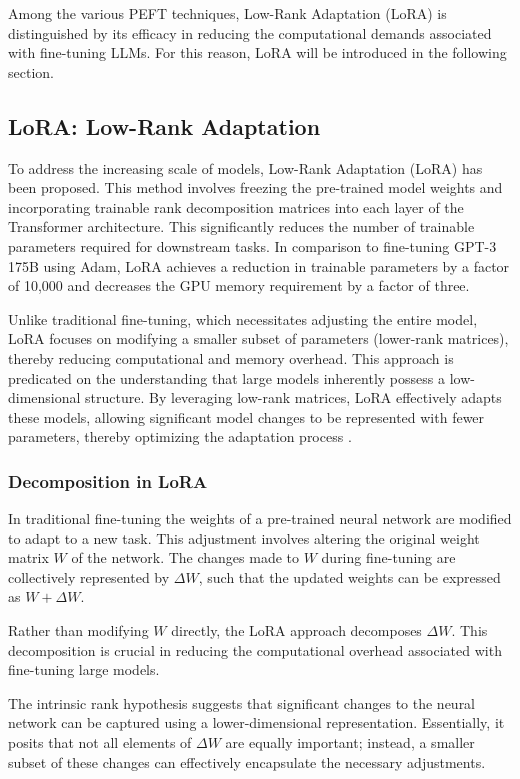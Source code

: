 Among the various PEFT techniques, Low-Rank Adaptation (LoRA) is distinguished by its efficacy in reducing the computational demands associated with fine-tuning LLMs. For this reason, LoRA will be introduced in the following section.

\subsection{LoRA: Low-Rank Adaptation}

To address the increasing scale of models, Low-Rank Adaptation (LoRA) has been proposed. This method involves freezing the pre-trained model weights and incorporating trainable rank decomposition matrices into each layer of the Transformer architecture. This significantly reduces the number of trainable parameters required for downstream tasks. In comparison to fine-tuning GPT-3 175B using Adam, LoRA achieves a reduction in trainable parameters by a factor of 10,000 and decreases the GPU memory requirement by a factor of three.

Unlike traditional fine-tuning, which necessitates adjusting the entire model, LoRA focuses on modifying a smaller subset of parameters (lower-rank matrices), thereby reducing computational and memory overhead. This approach is predicated on the understanding that large models inherently possess a low-dimensional structure. By leveraging low-rank matrices, LoRA effectively adapts these models, allowing significant model changes to be represented with fewer parameters, thereby optimizing the adaptation process \cite{hu2021lora}.

\subsubsection{Decomposition in LoRA}

In traditional fine-tuning the weights of a pre-trained neural network are modified to adapt to a new task. This adjustment involves altering the original weight matrix \( W \) of the network. The changes made to \( W \) during fine-tuning are collectively represented by \( \Delta W \), such that the updated weights can be expressed as \( W + \Delta W \).

Rather than modifying \( W \) directly, the LoRA approach decomposes \( \Delta W \). This decomposition is crucial in reducing the computational overhead associated with fine-tuning large models.

The intrinsic rank hypothesis suggests that significant changes to the neural network can be captured using a lower-dimensional representation. Essentially, it posits that not all elements of \( \Delta W \) are equally important; instead, a smaller subset of these changes can effectively encapsulate the necessary adjustments.

